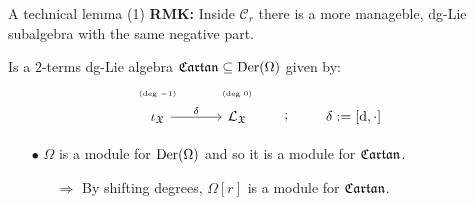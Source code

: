 \documentclass[beamer,10pt]{standalone}
\begin{document}
\begin{frame}{A technical lemma (1)}
  \textbf{RMK:} Inside $\mathcal{C}_r$ there is a more manageble, dg-Lie subalgebra with the same negative part.
  \vfill \pause

  \begin{defblock}
  	Is a $2$-terms dg-Lie algebra $\mathfrak{Cartan} \subseteq \mathrm{Der}(\Omega)$ given by:
  \begin{displaymath}
	\begin{tikzcd}[ampersand replacement=\&,row sep = small]
		\text{\tiny (deg $-1$)} \& \text{\tiny (deg $0$)}\&[2em]
		\\[-.7em]
		\iota_{\X} \ar[r,"\delta"] \& \Lie_{\X} \ar[r,phantom,";"] \& \delta:= [\d, \cdot]
	\end{tikzcd}
  \end{displaymath}
  \end{defblock}
  \vfill \pause

  \begin{itemize}
	\item[$\bullet$] $\Omega$ is a module for $\mathrm{Der}(\Omega)$ and so it is a module for $\mathfrak{Cartan}$.
	\begin{itemize}
		\item[$\Rightarrow$] \quad By shifting degrees, $\Omega[r]$ is a module for $\mathfrak{Cartan}$. 
	\end{itemize}
  \end{itemize}
  \vfill 

\end{frame}
\note[itemize]
{
	\item 
	\item 
}
\end{document}
